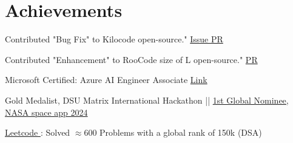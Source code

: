 \documentclass[a4paper]{extarticle}
\begin{document}
\section{Achievements}
    \begin{description}[font=$\bullet$]
    \item {Contributed "Bug Fix" to Kilocode open-source." {\href{https://github.com/Kilo-Org/kilocode/issues/2124}{Issue \faExternalLink*}}{\href{https://github.com/Kilo-Org/kilocode/issues/2124}{ PR \faExternalLink*}}}
    \vspace{-8 pt}
    \item {Contributed "Enhancement" to RooCode size of L open-source." {\href{https://github.com/RooCodeInc/Roo-Code/pull/6923}{PR \faExternalLink*}}}
    \vspace{-8 pt}
    \item {Microsoft Certified: Azure AI Engineer Associate {\href{https://learn.microsoft.com/api/credentials/share/en-us/nitinprajwal/F40D908188BCABC6?sharingId=47FD6B032A1D04E5}{Link \faExternalLink*}}}
    \vspace{-8 pt}
    \item{Gold Medalist, DSU Matrix International Hackathon || {\href{https://www.spaceappschallenge.org/nasa-space-apps-2024/find-a-team/aiastro/?tab=details}{1st Global Nominee, NASA space app 2024 \faExternalLink*}}}
    \vspace{-8 pt}
    \item{ {\href{https://leetcode.com/u/nitinprajwal/}{Leetcode \faExternalLink*} }: Solved \textbf{$\approx 600$} Problems with a global rank of 150k (DSA)}
    \end{description}
    
\end{document}
